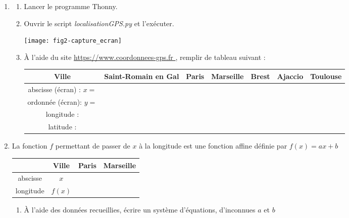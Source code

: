 \documentclass[a4paper,10pt]{article}
\begin{document}
\begin{enumerate}
\item \begin{enumerate}
\item Lancer le programme Thonny.
\item Ouvrir le script \textit{ localisationGPS.py }  et l'exécuter.
\begin{center}
\texttt{[image: fig2-capture\_ecran]}
\end{center}

\item  À  l'aide du site  \url{ https://www.coordonnees-gps.fr }, remplir de tableau suivant :



\bigskip
\renewcommand{\arraystretch}{2}
\begin{tabular}{|c|c|c|c|c|c|c|}
\hline 
Ville & Saint-Romain en Gal & Paris & Marseille & Brest &Ajaccio &Toulouse\\ 
\hline 
abscisse (écran) : $x=$ & \qquad\qquad\qquad   &\qquad\qquad\qquad  & \qquad\qquad\qquad  & \qquad\qquad\qquad & \qquad\qquad\qquad & \qquad\qquad\qquad  \\ 
\hline 
ordonnée (écran): $y=$ &&&&&&  \\ 
\hline 
longitude :  &&&&&& \\ 
\hline 
latitude :  & & & &&&  \\ 
\hline 
\end{tabular} 

\end{enumerate}

\bigskip
\item La fonction $f$ permettant de passer de $x$ à la longitude est une fonction affine définie par $f(x)=ax+b$


\begin{minipage}[]{.4\textwidth}
\renewcommand{\arraystretch}{3}
\begin{tabular}{|c|c|c|c|}
\hline 
 &Ville& Paris & Marseille  \\
\hline 
 abscisse &$x$ &&   \\
\hline 
longitude &$f(x)$ && \\ 
\hline 
\end{tabular} 
\end{minipage}
\begin{minipage}[]{.6\textwidth}
\begin{enumerate}
\item 
À l'aide des données recueillies, écrire  un système d'équations,  d'inconnues  $a$ et $b$
\bigskip 
\bigskip 
\bigskip 
\bigskip 
\bigskip 
\bigskip 


\end{enumerate}
\end{minipage}
\end{enumerate}
\end{document}
